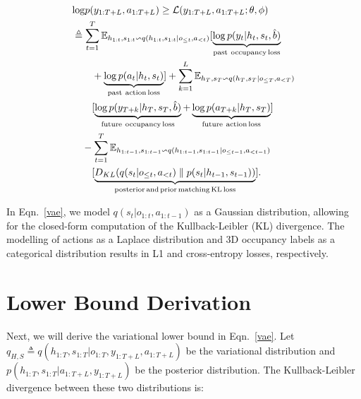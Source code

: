 \begin{footnotesize}
	\begin{equation} \label{vae}
	\begin{aligned}
	&{\rm log} p(y_{1:T+L},a_{1:T+L})\ge \mathcal{L}(y_{1:T+L},a_{1:T+L};\theta ,\phi ) \\ &\triangleq  \displaystyle\sum_{t=1}^{T}\mathbb{E}_{h_{1:t},s_{1:t}\backsim q(h_{1:t},s_{1:t}|o_{\leq t},a_{<t})}[\underbrace{\log p(y_t|h_t,s_t,\hat{b})}_{{\rm past \ occupancy\, loss}}\\
	&\qquad+\underbrace{\log p(a_t|h_t,s_t)}_{{\rm past \ action\, loss}}]  +\displaystyle\sum_{k=1}^{L}\mathbb{E}_{h_{T},s_{T}\backsim q(h_{T},s_{T}|o_{\leq T},a_{<T})}\\
	&\qquad[\underbrace{\log p(y_{T+k}|h_T,s_T,\hat{b})}_{{\rm future \ occupancy\, loss}}+\underbrace{\log p(a_{T+k}|h_T,s_T)}_{{\rm future \ action\, loss}}] \\
	&\quad-\displaystyle\sum_{t=1}^{T}\mathbb{E}_{h_{1:t-1},s_{1:t-1}\backsim q(h_{1:t-1},s_{1:t-1}|o_{\leq t-1},a_{<t-1} )}\\
	&\qquad[\underbrace{D_{KL}(q(s_t|o_{\leq t},a_{<t})\parallel p(s_t|h_{t-1},s_{t-1}))}_{{\rm posterior\, and\, prior\, matching\, KL\, loss}}].
	\end{aligned}
	\end{equation} 
\end{footnotesize}

In Eqn.~\ref{vae}, we model $q(s_t|o_{1:t}, a_{1:t-1})$ as a Gaussian distribution, allowing for the closed-form computation of the Kullback-Leibler (KL) divergence. The modelling of actions as a Laplace distribution and 3D occupancy labels as a categorical distribution results in L1 and cross-entropy losses, respectively. 
\section{Lower Bound Derivation} 

Next, we will derive the variational lower bound in Eqn.~\ref{vae}. Let $q_{H,S}\triangleq q(h_{1:T},s_{1:T}|o_{1:T},y_{1:T+L},a_{1:T+L})$ be the variational distribution and $p(h_{1:T},s_{1:T}|a_{1:T+L},y_{1:T+L})$ be the posterior distribution. The Kullback-Leibler divergence between these two distributions is:

